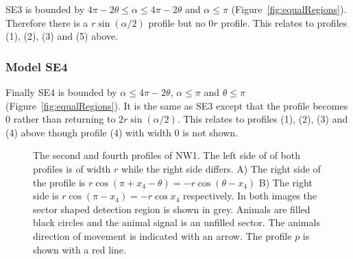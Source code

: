 SE3 is bounded by $4\pi - 2\theta \le \alpha \le 4\pi - 2\theta$ and $\alpha \le \pi$ (Figure~\ref{fig:equalRegions}).
Therefore there is a $r\sin(\alpha/2)$ profile but no $0r$ profile.
This relates to profiles (1), (2), (3) and (5) above.



\subsubsection{Model SE4} \label{SE4}

Finally SE4 is bounded by  $\alpha \le 4\pi - 2\theta $, $\alpha\le\pi$ and $\theta \le \pi$ (Figure~\ref{fig:equalRegions}).
It is the same as SE3 except that the profile becomes 0 rather than returning to $2r\sin(\alpha/2)$.
This relates to profiles (1), (2), (3) and (4) above though profile (4) with width 0 is not shown.




\begin{figure}[t]
  \centering
{
}
\caption[The second and fourth profiles of NW1]{
The second and fourth profiles of NW1.
The left side of of both profiles is of width $r$ while the right side differs.
A) The right side of the profile is $r\cos(\pi+x_4-\theta) = - r\cos(\theta - x_4 )$ 
B) The right side is $r\cos(\pi-x_4) = - r\cos x_4$ respectively.
In both images the sector shaped detection region is shown in grey.
Animals are filled black circles and the animal signal is an unfilled sector.
The animals direction of movement is indicated with an arrow.
The profile $p$ is shown with a red line.
}
\label{fig:NW1}
\end{figure}

